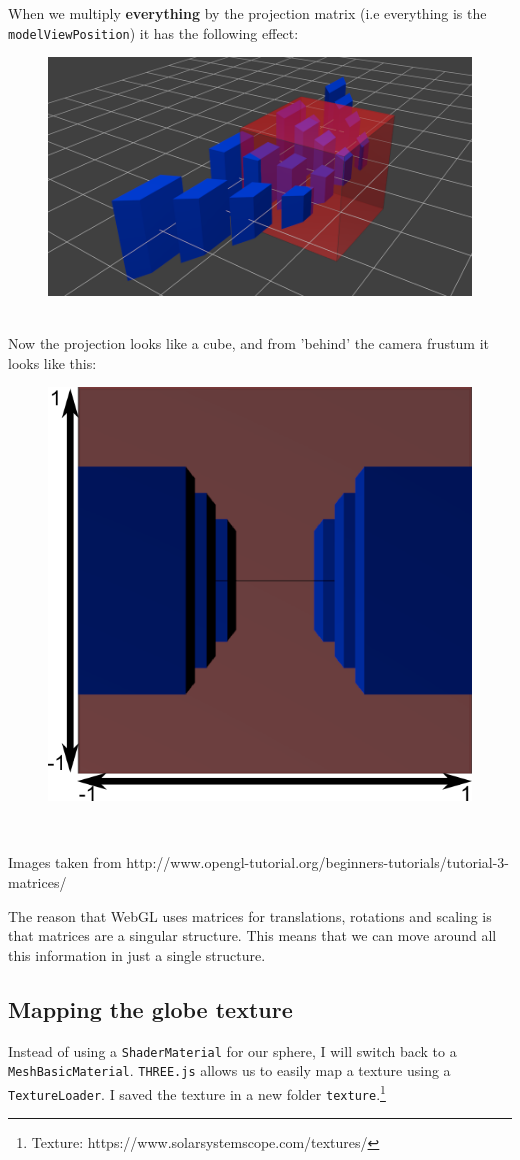When we multiply \textbf{everything} by the projection matrix (i.e everything is the \verb|modelViewPosition|) it has the following effect:
\begin{figure}[h]
\centering
\includegraphics[width=0.5\linewidth]{images/shader_output4}
\caption{}
\label{fig:shaderoutput4}
\end{figure} \\
Now the projection looks like a cube, and from 'behind' the camera frustum it looks like this:
\begin{figure}
\centering
\includegraphics[width=0.5\linewidth]{images/shader_output6}
\caption{}
\label{fig:shaderoutput6}
\end{figure} \\
\begin{footnotesize}
Images taken from http://www.opengl-tutorial.org/beginners-tutorials/tutorial-3-matrices/
\end{footnotesize}

The reason that WebGL uses matrices for translations, rotations and scaling is that matrices are a singular structure. This means that we can move around all this information in just a single structure.

\newpage
\subsection{Mapping the globe texture}
Instead of using a \verb|ShaderMaterial| for our sphere, I will switch back to a \verb|MeshBasicMaterial|. \verb|THREE.js| allows us to easily map a texture using a \verb|TextureLoader|. I saved the texture in a new folder \verb|texture|.\footnote{Texture: https://www.solarsystemscope.com/textures/}

